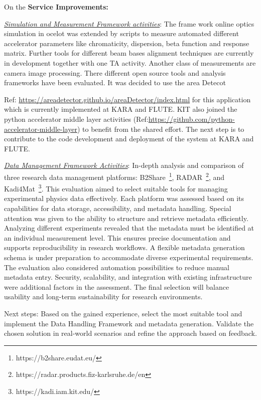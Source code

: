 On the \textbf{Service Improvements:}

\underline{\em{Simulation and Measurement Framework activities}}:  
The frame work online optics simulation in ocelot was extended by scripts to measure automated different accelerator parameters like chromaticity, dispersion, beta function and response matrix. Further tools for different beam bases alignment  techniques are currently in development together with one TA activity. Another class of measurements are camera image processing. There different open source tools and analysis frameworks have been evaluated. It was decided to use the area Detecot {Ref: \url{https://areadetector.github.io/areaDetector/index.html} for this application which is currently implemented at KARA and FLUTE. KIT also joined the python accelerator middle layer activities (Ref:\url{https://github.com/python-accelerator-middle-layer}) to benefit from the shared effort. The next step is to contribute to the code development and deployment of the system at KARA and FLUTE.

\underline{\em{Data Management Framework Activities}}: 
In-depth analysis and comparison of three research data management platforms: B2Share~\footnote{https://b2share.eudat.eu/}, RADAR~\footnote{https://radar.products.fiz-karlsruhe.de/en}, and Kadi4Mat~\footnote{https://kadi.iam.kit.edu/}. This evaluation aimed to select suitable tools for managing experimental physics data effectively. Each platform was assessed based on its capabilities for data storage, accessibility, and metadata handling. Special attention was given to the ability to structure and retrieve metadata efficiently. Analyzing different experiments revealed that the metadata must be identified at an individual measurement level. This ensures precise documentation and supports reproducibility in research workflows. A flexible metadata generation schema is under preparation to accommodate diverse experimental requirements. The evaluation also considered automation possibilities to reduce manual metadata entry. Security, scalability, and integration with existing infrastructure were additional factors in the assessment. The final selection will balance usability and long-term sustainability for research environments.

Next steps: Based on the gained experience, select the most suitable tool and implement the Data Handling Framework and metadata generation. Validate the chosen solution in real-world scenarios and refine the approach based on feedback.

}
